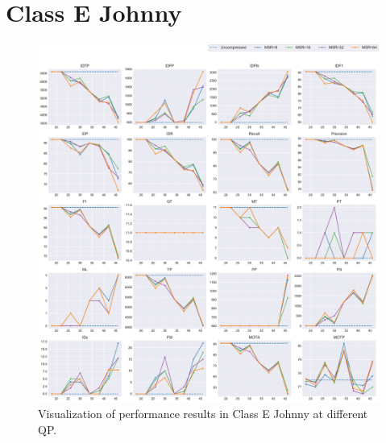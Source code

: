 
\section{Class E Johnny}
\label{sec:appendix/Johnny_all}


\begin{figure}[!htbp]
\centering
\includegraphics[width=1.0\linewidth]{img/appendix/Johnny_all_multiplots_qp.pdf}
\caption[Visualization of performance results in Class E Johnny at different QP]
{Visualization of performance results in Class E Johnny at different QP.}
\label{fig:Johnny_all_qp}
\end{figure}

